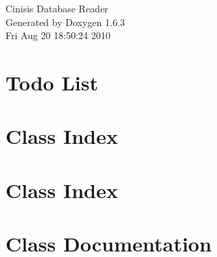 \documentclass[a4paper]{book}
\begin{document}
\hypersetup{pageanchor=false}
\begin{titlepage}
\vspace*{7cm}
\begin{center}
{\Large Cinisis Database Reader }\\
\vspace*{1cm}
{\large Generated by Doxygen 1.6.3}\\
\vspace*{0.5cm}
{\small Fri Aug 20 18:50:24 2010}\\
\end{center}
\end{titlepage}
\clearemptydoublepage
{}
\tableofcontents
\clearemptydoublepage
{}
\hypersetup{pageanchor=true}
\chapter{Todo List}
\label{todo}
\hypertarget{todo}{}

\chapter{Class Index}

\chapter{Class Index}

\chapter{Class Documentation}





















\printindex
\end{document}
